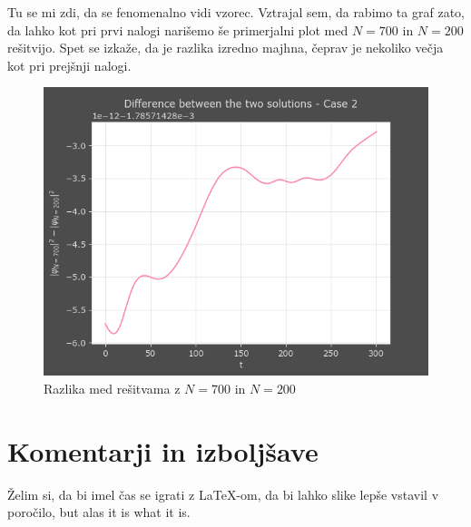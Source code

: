 \documentclass[a4paper]{article}
\begin{document}
Tu se mi zdi, da se fenomenalno vidi vzorec. Vztrajal sem, da rabimo ta graf zato, da lahko kot pri 
prvi nalogi narišemo še primerjalni plot med $N=700$ in $N=200$ rešitvijo. Spet se izkaže, da je razlika
izredno majhna, čeprav je nekoliko večja kot pri prejšnji nalogi.

\begin{figure}[H]
    \centering
    \includegraphics[width=\textwidth]{./images/delta_case2.png}
    \caption{Razlika med rešitvama z $N=700$ in $N=200$}
\end{figure}





\section{Komentarji in izboljšave}
Želim si, da bi imel čas se igrati z LaTeX-om, da bi lahko slike lepše vstavil v poročilo, but alas 
it is what it is. 


\newpage


\end{document}
